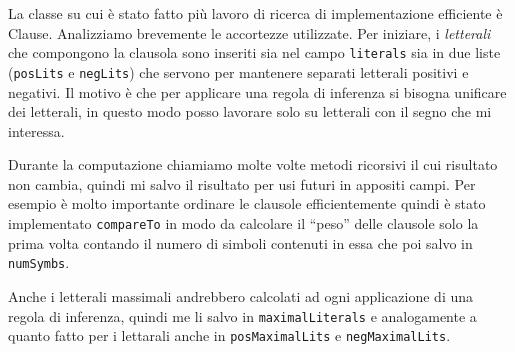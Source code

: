 \documentclass[a4paper,11pt]{article} %
\newcommand{\classe}{\textsf}
\newcommand{\metodo}{\texttt}
\newcommand{\cod}{\lstset{basicstyle=\ttfamily}\lstinline}
\begin{document}
La classe %
su cui è stato fatto più
lavoro di ricerca di %
implementazione efficiente è %
\classe{Clause}. %
Analizziamo brevemente le accortezze utilizzate. Per
iniziare, i \emph{letterali} che compongono la clausola
sono inseriti
sia nel campo \cod{literals}
sia in due liste (\cod{posLits} e \cod{negLits})
che servono per mantenere separati letterali positivi e negativi. 
Il motivo è che per applicare una regola di inferenza si
bisogna unificare dei letterali,
in questo modo posso 
lavorare solo su letterali con il segno che mi interessa. 

Durante la computazione chiamiamo molte volte metodi ricorsivi 
il cui risultato non cambia, quindi
mi salvo il risultato per usi futuri in appositi campi.
%
Per esempio è molto importante
ordinare le clausole efficientemente
quindi è stato implementato \metodo{compareTo} in modo da calcolare %
il ``peso'' delle clausole solo la prima volta
contando il numero di simboli contenuti in essa che poi salvo in
\cod{numSymbs}.

Anche i letterali massimali %
andrebbero calcolati ad ogni applicazione di una regola di inferenza,
quindi me li salvo in
\cod{maximalLiterals} e %
analogamente a quanto fatto per i lettarali anche in \cod{posMaximalLits} e 
\cod{negMaximalLits}. %
\end{document}

